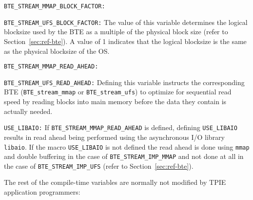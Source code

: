 \begin{description}
  
\item\lstinline|BTE_STREAM_MMAP_BLOCK_FACTOR:|
\item\lstinline|BTE_STREAM_UFS_BLOCK_FACTOR:| The value of this
  variable determines the logical blocksize used by the BTE as a
  multiple of the physical block size (refer to
  Section~\ref{sec:ref-bte}). A value of 1 indicates that the logical
  blocksize is the same as the physical blocksize of the OS.

\item\lstinline|BTE_STREAM_MMAP_READ_AHEAD:| 
\item\lstinline|BTE_STREAM_UFS_READ_AHEAD:| Defining this variable
  instructs the corresponding BTE (\lstinline|BTE_stream_mmap| or
  \lstinline|BTE_stream_ufs|) to optimize for sequential read speed by
  reading blocks into main memory before the data they contain is
  actually needed.  
  
\item\lstinline|USE_LIBAIO:| If \lstinline|BTE_STREAM_MMAP_READ_AHEAD|
  is defined, defining \lstinline|USE_LIBAIO| results in read ahead
  being performed using the asynchronous I/O library
  \lstinline|libaio|. If the macro \lstinline|USE_LIBAIO| is not
  defined the read ahead is done using \lstinline|mmap| and double
  buffering in the case of \lstinline|BTE_STREAM_IMP_MMAP| and not
  done at all in the case of \lstinline|BTE_STREAM_IMP_UFS| (refer to
  Section~\ref{sec:ref-bte}).  
\end{description}

\noindent
The rest of the compile-time variables are normally not
modified by TPIE application programmers:

